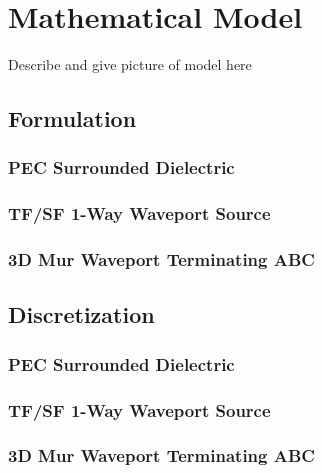 \section{Mathematical Model}
\label{sec:mathmod}

Describe and give picture of model here

\subsection{Formulation}
\label{subsec::form}

\subsubsection{PEC Surrounded Dielectric}
\label{subsubsec:tfs_formf}

\subsubsection{TF/SF 1-Way Waveport Source}
\label{subsubsec:tfsf_form}

\subsubsection{3D Mur Waveport Terminating ABC}
\label{subsubsec:tfsf_form}

\subsection{Discretization}
\label{subsec:disc}

\subsubsection{PEC Surrounded Dielectric}
\label{subsubsec:tfsf_disc}

\subsubsection{TF/SF 1-Way Waveport Source}
\label{subsubsec:tfsf_disc}

\subsubsection{3D Mur Waveport Terminating ABC}
\label{subsubsec:tfsf_disc}

